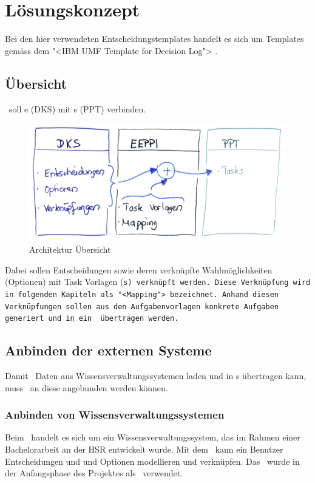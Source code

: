 \chapter{Lösungskonzept}
	
	Bei den hier verwendeten Entscheidungstemplates handelt es sich um Templates gemäss dem "<IBM UMF Template for Decision Log"> \cite{hand_ibm_2008}.
	
	\section{Übersicht}
		\eeppi\ soll \dks e (DKS) mit \ppt s (PPT) verbinden.
		
		\begin{figure}[H]
			\includegraphics[width=\textwidth]{architecture/media/img/eeppiSchema.jpg}
			\centering
			\caption{Architektur Übersicht}
			\label{fig:architectureSchema}
		\end{figure}	
		
		Dabei sollen Entscheidungen sowie deren verknüpfte Wahlmöglichkeiten (Optionen) mit Task Vorlagen (\tt s) verknüpft werden.
		Diese Verknüpfung wird in folgenden Kapiteln als "<Mapping"> bezeichnet. 
		Anhand diesen Verknüpfungen sollen aus den Aufgabenvorlagen konkrete Aufgaben generiert und in ein \ppt\ übertragen werden.
	
	
	\section{Anbinden der externen Systeme}
		Damit \eeppi\ Daten aus Wissensverwaltungssystemen laden und in \ppt s übertragen kann, muss \eeppi\ an diese angebunden werden können.
		
	
		\subsection{Anbinden von Wissensverwaltungssystemen}
			Beim \cdar\ handelt es sich um ein Wissensverwaltungssystem, 
			das im Rahmen einer Bachelorarbeit \cite{tinner_collaborative_2014} an der HSR entwickelt wurde. Mit dem \cdar\ kann ein Benutzer Entscheidungen und und Optionen modellieren und verknüpfen. Das \cdar\ wurde in der Anfangsphase des Projektes als \dks\ verwendet.
			
